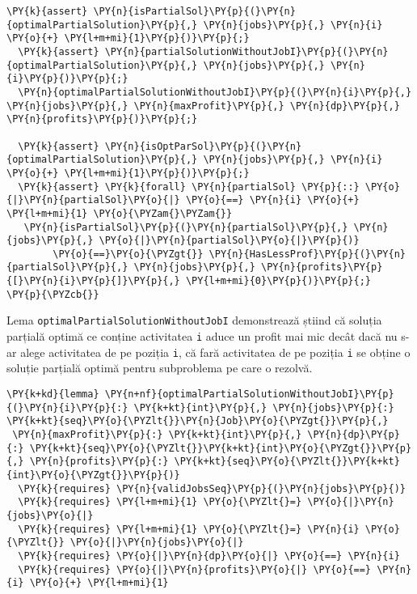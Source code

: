 \begin{itemize}
\begin{Verbatim}[commandchars=\\\{\},fontsize=\footnotesize]
  \PY{k}{assert} \PY{n}{isPartialSol}\PY{p}{(}\PY{n}{optimalPartialSolution}\PY{p}{,} \PY{n}{jobs}\PY{p}{,} \PY{n}{i} \PY{o}{+} \PY{l+m+mi}{1}\PY{p}{)}\PY{p}{;}
  \PY{k}{assert} \PY{n}{partialSolutionWithoutJobI}\PY{p}{(}\PY{n}{optimalPartialSolution}\PY{p}{,} \PY{n}{jobs}\PY{p}{,} \PY{n}{i}\PY{p}{)}\PY{p}{;}
  \PY{n}{optimalPartialSolutionWithoutJobI}\PY{p}{(}\PY{n}{i}\PY{p}{,} \PY{n}{jobs}\PY{p}{,} \PY{n}{maxProfit}\PY{p}{,} \PY{n}{dp}\PY{p}{,} \PY{n}{profits}\PY{p}{)}\PY{p}{;}

  \PY{k}{assert} \PY{n}{isOptParSol}\PY{p}{(}\PY{n}{optimalPartialSolution}\PY{p}{,} \PY{n}{jobs}\PY{p}{,} \PY{n}{i} \PY{o}{+} \PY{l+m+mi}{1}\PY{p}{)}\PY{p}{;}
  \PY{k}{assert} \PY{k}{forall} \PY{n}{partialSol} \PY{p}{::} \PY{o}{|}\PY{n}{partialSol}\PY{o}{|} \PY{o}{==} \PY{n}{i} \PY{o}{+} \PY{l+m+mi}{1} \PY{o}{\PYZam{}\PYZam{}}
   \PY{n}{isPartialSol}\PY{p}{(}\PY{n}{partialSol}\PY{p}{,} \PY{n}{jobs}\PY{p}{,} \PY{o}{|}\PY{n}{partialSol}\PY{o}{|}\PY{p}{)} 
        \PY{o}{==}\PY{o}{\PYZgt{}} \PY{n}{HasLessProf}\PY{p}{(}\PY{n}{partialSol}\PY{p}{,} \PY{n}{jobs}\PY{p}{,} \PY{n}{profits}\PY{p}{[}\PY{n}{i}\PY{p}{]}\PY{p}{,} \PY{l+m+mi}{0}\PY{p}{)}\PY{p}{;}
\PY{p}{\PYZcb{}}
\end{Verbatim}
Lema \texttt{optimalPartialSolutionWithoutJobI} demonstrează știind că soluția parțială optimă ce conține activitatea \texttt{i} aduce un profit mai mic decât dacă nu s-ar alege activitatea de pe poziția \texttt{i}, că fară activitatea de pe poziția \texttt{i} se obține o soluție parțială optimă pentru subproblema pe care o rezolvă.
\begin{Verbatim}[commandchars=\\\{\},fontsize=\footnotesize]
\PY{k+kd}{lemma} \PY{n+nf}{optimalPartialSolutionWithoutJobI}\PY{p}{(}\PY{n}{i}\PY{p}{:} \PY{k+kt}{int}\PY{p}{,} \PY{n}{jobs}\PY{p}{:} \PY{k+kt}{seq}\PY{o}{\PYZlt{}}\PY{n}{Job}\PY{o}{\PYZgt{}}\PY{p}{,}
 \PY{n}{maxProfit}\PY{p}{:} \PY{k+kt}{int}\PY{p}{,} \PY{n}{dp}\PY{p}{:} \PY{k+kt}{seq}\PY{o}{\PYZlt{}}\PY{k+kt}{int}\PY{o}{\PYZgt{}}\PY{p}{,} \PY{n}{profits}\PY{p}{:} \PY{k+kt}{seq}\PY{o}{\PYZlt{}}\PY{k+kt}{int}\PY{o}{\PYZgt{}}\PY{p}{)}
  \PY{k}{requires} \PY{n}{validJobsSeq}\PY{p}{(}\PY{n}{jobs}\PY{p}{)}
  \PY{k}{requires} \PY{l+m+mi}{1} \PY{o}{\PYZlt{}=} \PY{o}{|}\PY{n}{jobs}\PY{o}{|}
  \PY{k}{requires} \PY{l+m+mi}{1} \PY{o}{\PYZlt{}=} \PY{n}{i} \PY{o}{\PYZlt{}} \PY{o}{|}\PY{n}{jobs}\PY{o}{|}
  \PY{k}{requires} \PY{o}{|}\PY{n}{dp}\PY{o}{|} \PY{o}{==} \PY{n}{i}
  \PY{k}{requires} \PY{o}{|}\PY{n}{profits}\PY{o}{|} \PY{o}{==} \PY{n}{i} \PY{o}{+} \PY{l+m+mi}{1}

\end{Verbatim}
\end{itemize}
